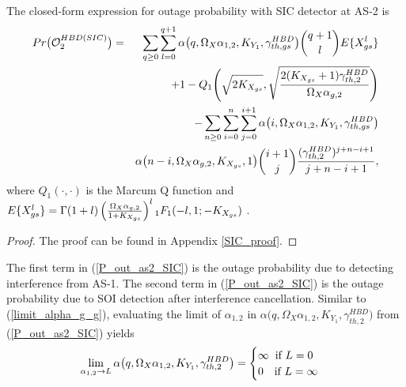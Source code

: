 \begin{theorem}
The closed-form expression for outage probability with SIC detector at AS-2 is
\begin{eqnarray} \label{P_out_as2_SIC}
Pr\big(\mathcal{O}_{2}^{HBD(SIC)}\big) & = & \sum_{q\geq0}\sum_{l=0}^{q+1} \alpha\big(q,\Omega_X\alpha_{1,2},K_{Y_{1}},\gamma_{th,gs}^{HBD}\big) \binom{q+1}{l} E\{X_{gs}^l\} \nonumber \\
&& \hspace{-0.6in} + 1 - Q_1\Bigg( \sqrt{2K_{X_{gs}}}, \sqrt{\frac{2(K_{X_{gs}}+1)\gamma_{th,2}^{HBD}}{\Omega_{X}\alpha_{g,2}}} \Bigg) \nonumber\\
&& \hspace{-0.6in} - \sum_{n\geq0}\sum_{i=0}^{n}\sum_{j=0}^{i+1} \alpha\big(i,\Omega_X\alpha_{1,2},K_{Y_{1}},\gamma_{th,gs}^{HBD}\big)  \nonumber\\
&& \alpha\big(n-i,\Omega_X\alpha_{g,2},K_{X_{gs}},1\big) \binom{i+1}{j}\frac{(\gamma_{th,2}^{HBD})^{j+n-i+1}}{j+n-i+1},
\end{eqnarray}
where $Q_1\left(\cdot,\cdot\right)$ is the Marcum Q function \cite{andras2011generalized} and $E\{X_{gs}^l\}=\Gamma(1+l)\left(\frac{\Omega_{X}\alpha_{g,2}}{1+K_{X_{gs}}}\right)^{l}\\{}_1{F_1}(-l,1;-K_{X_{gs}})$ \cite[Table II]{rached2017unified}.
\end{theorem}

\begin{proof}
The proof can be found in Appendix \ref{SIC_proof}.
\end{proof}

The first term in (\ref{P_out_as2_SIC}) is the outage probability due to detecting interference from AS-1. The second term in (\ref{P_out_as2_SIC}) is the outage probability due to SOI detection after interference cancellation. Similar to (\ref{limit_alpha_g_g}), evaluating the limit of $\alpha_{1,2}$ in $\alpha\big(q,\Omega_X\alpha_{1,2},K_{Y_{1}},\gamma_{th,2}^{HBD}\big)$ from (\ref{P_out_as2_SIC}) yields
\begin{equation} \label{limit_alpha_1_2_SIC}
\lim_{\alpha_{1,2} \to L} \alpha\big(q,\Omega_X\alpha_{1,2},K_{Y_{1}},\gamma_{th,2}^{HBD}\big) =
  \begin{cases}
    \infty \hspace{0.2cm} \text{if } L=0\\
		0 \hspace{0.35cm} \text{if } L=\infty
  \end{cases}
\end{equation}

